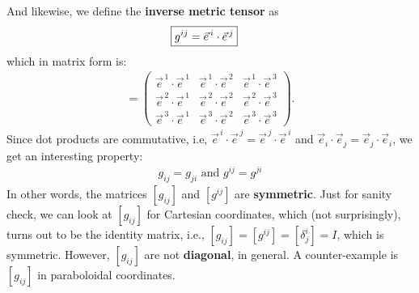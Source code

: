 \documentclass{book}
\theoremstyle{definition}
\begin{document}
And likewise, we define the \textbf{inverse metric tensor} as
\begin{align*}
\Aboxed{g^{ij} &= \vec{e}^{\,i}\cdot\vec{e}^{\,j}}
\end{align*}
which in matrix form is:
\begin{align*}
[g^{ij}] = 
\begin{pmatrix}
\vec{e}^{\,1}\cdot\vec{e}^{\,1} & \vec{e}^{\,1}\cdot\vec{e}^{\,2} & \vec{e}^{\,1}\cdot\vec{e}^{\,3} \\
\vec{e}^{\,2}\cdot\vec{e}^{\,1} & \vec{e}^{\,2}\cdot\vec{e}^{\,2} & \vec{e}^{\,2}\cdot\vec{e}^{\,3} \\
\vec{e}^{\,3}\cdot\vec{e}^{\,1} & \vec{e}^{\,3}\cdot\vec{e}^{\,2} & \vec{e}^{\,3}\cdot\vec{e}^{\,3} 
\end{pmatrix}.
\end{align*}
Since dot products are commutative, i.e, $\vec{e}^{\,i}\cdot\vec{e}^{\,j} = \vec{e}^{\,j}\cdot\vec{e}^{\,i}$ and $\vec{e}_i\cdot\vec{e}_j = \vec{e}_j\cdot\vec{e}_i$, we get an interesting property:
\begin{align*}
\boxed{g_{ij} = g_{ji} \text{ and }  g^{ij} = g^{ji}}
\end{align*}
In other words, the matrices $[g_{ij}]$ and $[g^{ij}]$ are \textbf{symmetric}. Just for sanity check, we can look at $[g_{ij}]$ for Cartesian coordinates, which (not surprisingly), turns out to be the identity matrix, i.e., $[g_{ij}] = [g^{ij}] = [\delta^i_j] = I$, which is symmetric. However, $[g_{ij}]$ are not \textbf{diagonal}, in general. A counter-example is $[g_{ij}]$ in paraboloidal coordinates. \\
\end{document}
